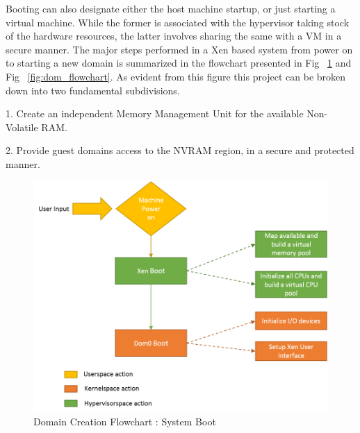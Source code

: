 Booting can also designate either the host machine startup, or just starting a virtual machine. While the former is associated with the hypervisor taking stock of the hardware resources, the latter involves sharing the same with a VM in a secure manner. The major steps performed in a Xen based system from power on to starting a new domain is summarized in the flowchart presented in Fig ~\ref{fig:xen_flowchart} and Fig ~\ref{fig:dom_flowchart}. As evident from this figure this project can be broken down into two fundamental subdivisions.

1. Create an independent Memory Management Unit for the available Non-Volatile RAM.

2. Provide guest domains access to the NVRAM region, in a secure and protected manner. 


\begin{figure}[H]
\centering
\includegraphics[scale=0.9]{figures/domain_creation1.png}
\caption{Domain Creation Flowchart : System Boot}
\label{fig:xen_flowchart}
\end{figure}

